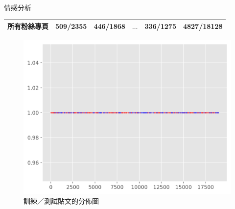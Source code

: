\documentclass[final,hyperref={pdfpagelabels=false}]{beamer}
\begin{document}
\begin{CJK}{UTF8}{bsmi}
\begin{frame}
\begin{minipage}{\textwidth}
\begin{block}{情感分析}
\begin{minipage}{0.39\textwidth}
\begin{table}[!htbp]
\begin{tabular}{@{}L{8.5cm}R{4.5cm}R{4.5cm}R{1.7cm}R{4.5cm}R{5.7cm}@{}}
  {\bfseries 所有粉絲專頁} & 509/2355 & 446/1868 & $\ldots$ & 336/1275 & 4827/18128 \\
  \bottomrule
  \end{tabular}
  \end{table}
\end{minipage}
\quad
\begin{minipage}{0.25\textwidth}
  \begin{figure}[!htbp]
  \centering
  \includegraphics[width=\columnwidth]{meta}
  \caption{訓練／測試貼文的分佈圖}
  \label{f3}
  \end{figure}
\end{minipage}
\end{block}
\end{minipage}


\end{frame}
\end{CJK}
\end{document}
